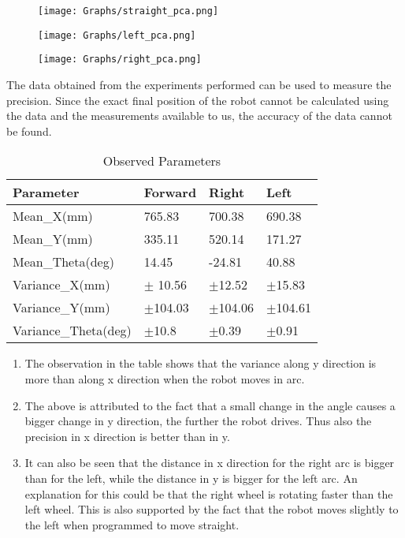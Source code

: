 \documentclass[10pt,a4paper]{article}
\begin{document}
\begin{figure}[H]
	\centering
	\texttt{[image: Graphs/straight\_pca.png]}
\end{figure}

\begin{figure}[H]
	\centering
	\texttt{[image: Graphs/left\_pca.png]}
\end{figure}

\begin{figure}[H]
	\centering
	\texttt{[image: Graphs/right\_pca.png]}
\end{figure}



The data obtained from the experiments performed can be used to measure the precision.
Since the exact final position of the robot cannot be calculated using the data and the measurements available to us, the accuracy of the data cannot be found.

\begin{table}[ht]				
	\centering
	\begin{tabular}{ | C{3cm} | C{3cm}|  C{3cm} | C{3cm} |} 
		\hline
		\textbf{Parameter} & \textbf{Forward} & \textbf{Right} & \textbf{Left}\\ 
		\hline
		Mean\_X(mm)  & 765.83 & 700.38 & 690.38  \\ 
		\hline
		Mean\_Y(mm)  & 335.11 & 520.14 & 171.27  \\  
		\hline
		Mean\_Theta(deg)  & 14.45 & -24.81 & 40.88  \\ 
		\hline
		Variance\_X(mm)  & $\pm$ 10.56 & $\pm$12.52 & $\pm$15.83 \\  
		\hline
		Variance\_Y(mm)  & $\pm$104.03 & $\pm$104.06 & $\pm$104.61  \\ 
		\hline
		Variance\_Theta(deg)  & $\pm$10.8 & $\pm$0.39 & $\pm$0.91  \\  
		\hline
	\end{tabular}
	\caption{Observed Parameters}
	\label{Tab:Tcr}
\end{table}

\begin{enumerate}
	\item
	The observation in the table shows that the variance along y direction is more than along x direction when the robot moves in arc.
	\item
	The above is attributed to the fact that a small change in the angle
	causes a bigger change in y direction, the further the robot drives.
	Thus also the precision in x direction is better than in y.
	\item
	It can also be seen that the distance in x direction for the right arc
	is bigger than for the left, while the distance in y is bigger for the
	left arc. An explanation for this could be that the right wheel is rotating faster than the left wheel. This is also supported by the fact that the robot moves slightly to the left when programmed to move straight.
\end{enumerate}
\end{document}
